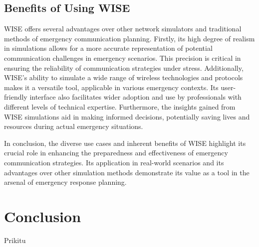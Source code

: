 \documentclass[journal]{IEEEtran}
\begin{document}
\subsection{Benefits of Using WISE}
WISE offers several advantages over other network simulators and traditional methods of emergency communication planning. Firstly, its high degree of realism in simulations allows for a more accurate representation of potential communication challenges in emergency scenarios. This precision is critical in ensuring the reliability of communication strategies under stress. Additionally, WISE's ability to simulate a wide range of wireless technologies and protocols makes it a versatile tool, applicable in various emergency contexts. Its user-friendly interface also facilitates wider adoption and use by professionals with different levels of technical expertise. Furthermore, the insights gained from WISE simulations aid in making informed decisions, potentially saving lives and resources during actual emergency situations.

In conclusion, the diverse use cases and inherent benefits of WISE highlight its crucial role in enhancing the preparedness and effectiveness of emergency communication strategies. Its application in real-world scenarios and its advantages over other simulation methods demonstrate its value as a tool in the arsenal of emergency response planning.

\section{Conclusion}
Prikitu


\ifCLASSOPTIONcaptionsoff
  \newpage
\fi

\end{document}
